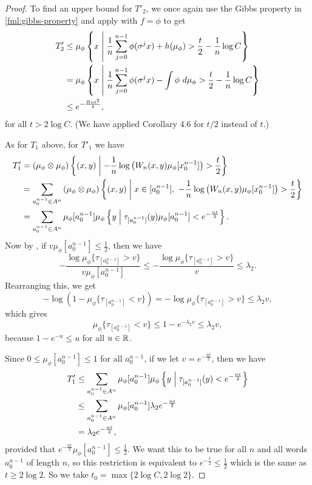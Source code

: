 \begin{theorem}
\begin{proof}
		To find an upper bound for $T'_2$, we once again use the Gibbs property in \eqref{fml:gibbs-property} and apply  with $f = \phi$ to get
		\begin{align*}
			T'_2 &\leq \mu_\phi\left\{x \mathrel{}\middle|\mathrel{} \frac{1}{n}\sum_{j = 0}^{n - 1}{\phi(\sigma^j{x})} + h(\mu_\phi) > \frac{t}{2} - \frac{1}{n}\log{C}\right\} \\
				&= \mu_\phi\left\{x \mathrel{}\middle|\mathrel{} \frac{1}{n}\sum_{j = 0}^{n - 1}{\phi(\sigma^j{x})} - \int{\phi\ d\mu_\phi} > \frac{t}{2} - \frac{1}{n}\log{C}\right\} \\
				&\leq e^{-\frac{Bnt^2}{4}},
		\end{align*}
		for all $t > 2\log{C}$. (We have applied Corollary 4.6 for $t / 2$ instead of $t$.)
		
		As for $T_1$ above, for $T'_1$ we have
		\begin{align*}
			T'_1 &= (\mu_\phi \otimes \mu_\phi)\left\{(x, y) \midmid -\frac{1}{n}\log\left(W_n(x, y) \mu_\phi[x_0^{n - 1}]\right) > \frac{t}{2}\right\} \\
				&= \sum_{a_0^{n - 1} \in A^n}{(\mu_\phi \otimes \mu_\phi)\left\{(x, y) \midmid x \in [a_0^{n - 1}],\ -\frac{1}{n}\log\left(W_n(x, y) \mu_\phi[x_0^{n - 1}]\right) > \frac{t}{2}\right\}} \\
				&= \sum_{a_0^{n - 1} \in A^n} \mu_\phi[a_0^{n - 1}]\mu_\phi\left\{y \midmid \tau_{[a_0^{n - 1}]}(y) \mu_\phi[a_0^{n - 1}] < e^{-\frac{nt}{2}}\right\}.
		\end{align*}
		Now by , if $v\mu_\phi[a_0^{n - 1}] \leq \frac{1}{2}$, then we have
		\[
			-\frac{\log{\mu_\phi\{\tau_{[a_0^{n - 1}]} > v\}}}{v\mu_\phi[a_0^{n - 1}]} \leq -\frac{\log{\mu_\phi\{\tau_{[a_0^{n - 1}]} > v\}}}{v} \leq \lambda_2.
		\]
		Rearranging this, we get
		\[
			-\log\left(1 - \mu_\phi\{\tau_{[a_0^{n - 1}]} < v\}\right) = -\log{\mu_\phi\{\tau_{[a_0^{n - 1}]} > v\}} \leq \lambda_2 v,
		\]
		which gives
		\[
			\mu_\phi\{\tau_{[a_0^{n - 1}]} < v\} \leq 1 - e^{-\lambda_2 v} \leq \lambda_2 v,
		\]
		because $1 - e^{-u} \leq u$ for all $u \in \mathbb{R}$.
		
		Since $0 \leq \mu_\phi[a_0^{n - 1}] \leq 1$ for all $a_0^{n - 1}$, if we let $v = e^{-\frac{nt}{2}}$, then we have
		\begin{align*}
			T'_1 &\leq \sum_{a_0^{n - 1} \in A^n} \mu_\phi[a_0^{n - 1}]\mu_\phi\left\{y \mathrel{}\middle|\mathrel{} \tau_{[a_0^{n - 1}]}(y) < e^{-\frac{nt}{2}}\right\} \\
				&\leq \sum_{a_0^{n - 1} \in A^n} \mu_\phi[a_0^{n - 1}] \lambda_2 e^{-\frac{nt}{2}} \\
				&= \lambda_2 e^{-\frac{nt}{2}},
		\end{align*}
		provided that $e^{-\frac{nt}{2}}\mu_\phi[a_0^{n - 1}] \leq \frac{1}{2}$. We want this to be true for all $n$ and all words $a_0^{n - 1}$ of length $n$, so this restriction is equivalent to $e^{-\frac{t}{2}} \leq \frac{1}{2}$ which is the same as $t \geq 2\log{2}$. So we take $t_0 = \max\{2\log{C}, 2 \log{2}\}$.
		

\end{proof}
\end{theorem}
